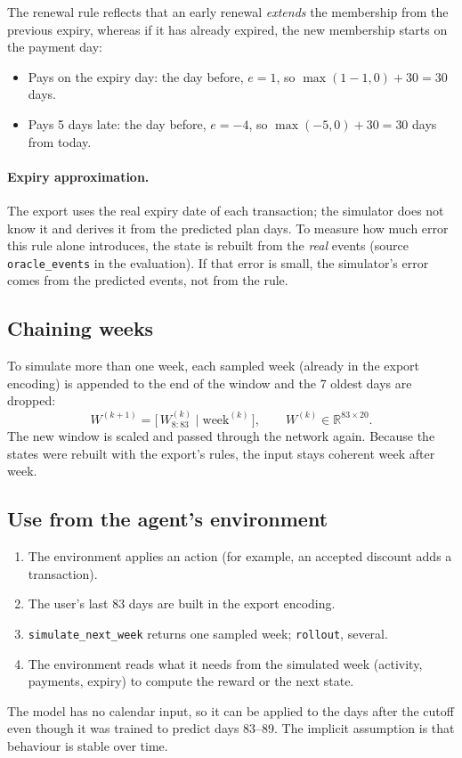 \documentclass[11pt]{article}
\newcommand{\R}{\mathbb{R}}
\newcommand{\code}[1]{\texttt{#1}}
\begin{document}
The renewal rule reflects that an early renewal \emph{extends} the membership from the previous expiry, whereas if it has already expired, the new membership starts on the payment day:
\begin{itemize}
  \item Pays on the expiry day: the day before, $e = 1$, so $\max(1 - 1, 0) + 30 = 30$ days.
  \item Pays 5 days late: the day before, $e = -4$, so $\max(-5, 0) + 30 = 30$ days from today.
\end{itemize}

\paragraph{Expiry approximation.} The export uses the real expiry date of each transaction; the simulator does not know it and derives it from the predicted plan days. To measure how much error this rule alone introduces, the state is rebuilt from the \emph{real} events (source \code{oracle\_events} in the evaluation). If that error is small, the simulator's error comes from the predicted events, not from the rule.

\subsection{Chaining weeks}
\label{sec:rollout}

To simulate more than one week, each sampled week (already in the export encoding) is appended to the end of the window and the 7 oldest days are dropped:
\begin{equation}
W^{(k+1)} = \big[\, W^{(k)}_{8:83} \;\big|\; \text{week}^{(k)} \,\big], \qquad W^{(k)} \in \R^{83 \times 20}.
\end{equation}
The new window is scaled and passed through the network again. Because the states were rebuilt with the export's rules, the input stays coherent week after week.

\subsection{Use from the agent's environment}
\label{sec:use}

\begin{enumerate}
  \item The environment applies an action (for example, an accepted discount adds a transaction).
  \item The user's last 83 days are built in the export encoding.
  \item \code{simulate\_next\_week} returns one sampled week; \code{rollout}, several.
  \item The environment reads what it needs from the simulated week (activity, payments, expiry) to compute the reward or the next state.
\end{enumerate}
The model has no calendar input, so it can be applied to the days after the cutoff even though it was trained to predict days 83--89. The implicit assumption is that behaviour is stable over time.
\end{document}
